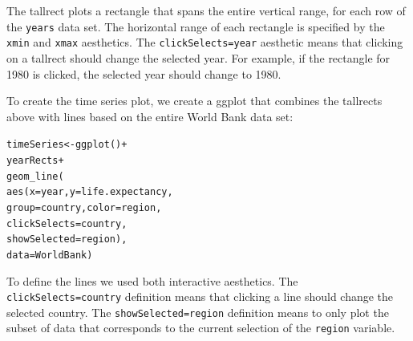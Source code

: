 \documentclass[journal]{vgtc}\usepackage[]{graphicx}\usepackage[]{color}
\makeatletter
\newcommand{\hlopt}[1]{\textcolor[rgb]{0,0,0}{#1}}%
\newcommand{\hlstd}[1]{\textcolor[rgb]{0,0,0}{#1}}%
\newcommand{\hlkwb}[1]{\textcolor[rgb]{0,0,0}{#1}}%
\newcommand{\hlkwc}[1]{\textcolor[rgb]{0,0,1}{#1}}%
\newcommand{\hlkwd}[1]{\textcolor[rgb]{0,0,0}{#1}}%
\newenvironment{kframe}{%
 \def\at@end@of@kframe{}%
 \ifinner\ifhmode%
  \def\at@end@of@kframe{\end{minipage}}%
  \begin{minipage}{\columnwidth}%
 \fi\fi%
 \def\FrameCommand##1{\hskip\@totalleftmargin \hskip-\fboxsep
 \colorbox{shadecolor}{##1}\hskip-\fboxsep
     \hskip-\linewidth \hskip-\@totalleftmargin \hskip\columnwidth}%
 \MakeFramed {\advance\hsize-\width
   \@totalleftmargin\z@ \linewidth\hsize
   \@setminipage}}%
 {\par\unskip\endMakeFramed%
 \at@end@of@kframe}
\newenvironment{knitrout}{}{} %
\makeatother
\begin{document}
The tallrect plots a rectangle that spans the entire vertical range,
for each row of the \texttt{years} data set. The horizontal range of
each rectangle is specified by the \texttt{xmin} and \texttt{xmax}
aesthetics. The \texttt{clickSelects=year} aesthetic means that
clicking on a tallrect should change the selected year. For example,
if the rectangle for 1980 is clicked, the selected year should change
to 1980.





To create the time series plot, we create a ggplot that combines the
tallrects above with lines based on the entire World Bank data set:

\begin{knitrout}
\color{fgcolor}\begin{kframe}
\begin{alltt}
\hlstd{timeSeries} \hlkwb{<-} \hlkwd{ggplot}\hlstd{()}\hlopt{+}
  \hlstd{yearRects}\hlopt{+}
  \hlkwd{geom_line}\hlstd{(}
    \hlkwd{aes}\hlstd{(}\hlkwc{x}\hlstd{=year,} \hlkwc{y}\hlstd{=life.expectancy,}
        \hlkwc{group}\hlstd{=country,} \hlkwc{color}\hlstd{=region,}
        \hlkwc{clickSelects}\hlstd{=country,}
        \hlkwc{showSelected}\hlstd{=region),}
    \hlkwc{data}\hlstd{=WorldBank)}
\end{alltt}
\end{kframe}
\end{knitrout}

To define the lines we used both interactive aesthetics. The
\texttt{clickSelects=country} definition means that clicking a line
should change the selected country. The \texttt{showSelected=region}
definition means to only plot the subset of data that corresponds to
the current selection of the \texttt{region} variable.
\end{document}
